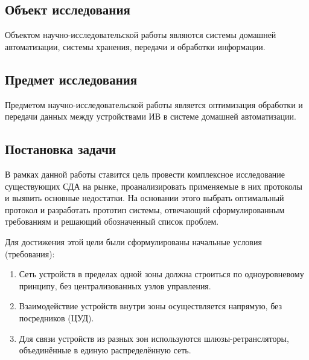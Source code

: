 \documentclass[14pt,a4paper]{extarticle}
\begin{document}
\subsection{Объект исследования}


Объектом научно-исследовательской работы являются системы домашней автоматизации, системы хранения, передачи и обработки информации.


\subsection{Предмет исследования}



Предметом научно-исследовательской работы является оптимизация обработки и передачи данных между устройствами ИВ в системе домашней автоматизации.

\subsection{Постановка задачи}


В рамках данной работы ставится цель провести комплексное исследование существующих СДА на рынке, проанализировать применяемые в них протоколы и выявить основные недостатки. На
основании этого выбрать оптимальный протокол и разработать прототип системы, отвечающий сформулированным требованиям и решающий обозначенный список проблем.

Для достижения этой цели были сформулированы начальные условия (требования):

\begin{enumerate}
    \item Сеть устройств в пределах одной зоны должна строиться по одноуровневому принципу, без централизованных узлов управления.
    \item Взаимодействие устройств внутри зоны осуществляется напрямую, без посредников (ЦУД).
    \item Для связи устройств из разных зон используются шлюзы-ретрансляторы, объединённые в единую распределённую сеть.
\end{enumerate}
\end{document}
